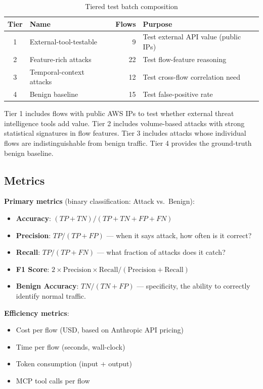\documentclass[12pt, a4paper, oneside]{report}
\begin{document}
\begin{table}[H]
\centering
\caption{Tiered test batch composition}
\label{tab:tiers}
\begin{tabular}{@{}clrl@{}}
\toprule
\textbf{Tier} & \textbf{Name} & \textbf{Flows} & \textbf{Purpose} \\
\midrule
1 & External-tool-testable  &  9 & Test external API value (public IPs) \\
2 & Feature-rich attacks    & 22 & Test flow-feature reasoning \\
3 & Temporal-context attacks & 12 & Test cross-flow correlation need \\
4 & Benign baseline         & 15 & Test false-positive rate \\
\bottomrule
\end{tabular}
\end{table}

Tier 1 includes flows with public AWS IPs to test whether external threat
intelligence tools add value. Tier 2 includes volume-based attacks with
strong statistical signatures in flow features. Tier 3 includes attacks whose
individual flows are indistinguishable from benign traffic. Tier 4 provides
the ground-truth benign baseline.

\subsection{Metrics}

\textbf{Primary metrics} (binary classification: Attack vs.\ Benign):
\begin{itemize}
  \item \textbf{Accuracy}: $(TP + TN) / (TP + TN + FP + FN)$
  \item \textbf{Precision}: $TP / (TP + FP)$ --- when it says attack, how often
        is it correct?
  \item \textbf{Recall}: $TP / (TP + FN)$ --- what fraction of attacks does it
        catch?
  \item \textbf{F1 Score}: $2 \times \text{Precision} \times \text{Recall} /
        (\text{Precision} + \text{Recall})$
  \item \textbf{Benign Accuracy}: $TN / (TN + FP)$ --- specificity, the ability
        to correctly identify normal traffic.
\end{itemize}

\textbf{Efficiency metrics}:
\begin{itemize}
  \item Cost per flow (USD, based on Anthropic API pricing)
  \item Time per flow (seconds, wall-clock)
  \item Token consumption (input + output)
  \item MCP tool calls per flow
\end{itemize}
\end{document}
